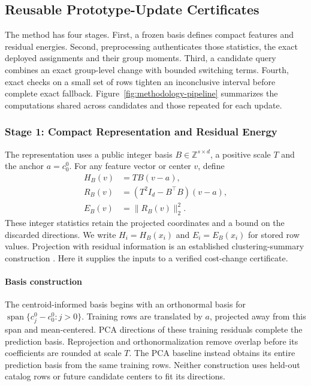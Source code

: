 \subsection{Reusable Prototype-Update Certificates}
\label{sec:methodology-pipeline}
The method has four stages. First, a frozen basis defines compact features
and residual energies. Second, preprocessing authenticates those statistics,
the exact deployed assignments and their group moments. Third, a candidate
query combines an exact group-level change with bounded switching terms.
Fourth, exact checks on a small set of rows tighten an inconclusive interval
before complete exact fallback. Figure~\ref{fig:methodology-pipeline}
summarizes the computations shared across candidates and those repeated for
each update.


\subsubsection{Stage 1: Compact Representation and Residual Energy}
\label{sec:methodology-representation}
The representation uses a public integer basis $B\in\mathbb Z^{s\times d}$,
a positive scale $T$ and the anchor $a=c^0_0$. For any feature vector or
center $v$, define
\begin{align}
 H_B(v)&=TB(v-a),\nonumber\\
 R_B(v)&=(T^2I_d-B^\top B)(v-a),\nonumber\\
 E_B(v)&=\|R_B(v)\|_2^2.
 \label{eq:methodology-statistics}
\end{align}
These integer statistics retain the projected coordinates and a bound on
the discarded directions. We write $H_i=H_B(x_i)$ and $E_i=E_B(x_i)$ for
stored row values. Projection with residual information is an
established clustering-summary construction
\cite{feldman2013tiny,feldman2020tiny}. Here it supplies the inputs to a
verified cost-change certificate.

\paragraph{Basis construction}
The centroid-informed basis begins with an orthonormal basis for
$\operatorname{span}\{c^0_j-c^0_0:j>0\}$. Training rows are translated by
$a$, projected away from this span and mean-centered. PCA directions of
these training residuals complete the prediction basis. Reprojection and
orthonormalization remove overlap before its coefficients are rounded at
scale $T$. The PCA baseline instead obtains its entire prediction basis
from the same training rows. Neither construction uses held-out catalog
rows or future candidate centers to fit its directions.

